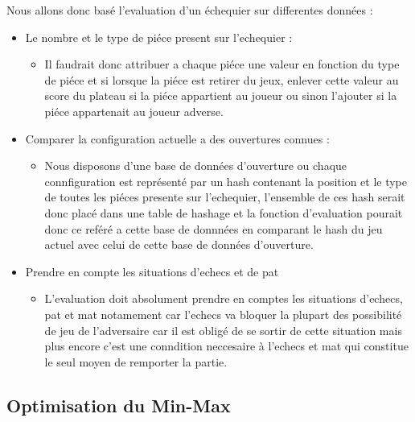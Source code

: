 \documentclass[12pt]{article}
\begin{document}
Nous allons donc basé l'evaluation d'un échequier sur differentes
données :

\begin{itemize}
\item
  Le nombre et le type de piéce present sur l'echequier :

  \begin{itemize}
  \itemsep1pt\parskip0pt
  \item
    Il faudrait donc attribuer a chaque piéce une valeur en fonction du
    type de piéce et si lorsque la piéce est retirer du jeux, enlever
    cette valeur au score du plateau si la piéce appartient au joueur ou
    sinon l'ajouter si la piéce appartenait au joueur adverse.
  \end{itemize}
\item
  Comparer la configuration actuelle a des ouvertures connues :

  \begin{itemize}
  \itemsep1pt\parskip0pt
  \item
    Nous disposons d'une base de données d'ouverture ou chaque
    connfiguration est représenté par un hash contenant la position et
    le type de toutes les piéces presente sur l'echequier, l'ensemble de
    ces hash serait donc placé dans une table de hashage et la fonction
    d'evaluation pourait donc ce reféré a cette base de donnnées en
    comparant le hash du jeu actuel avec celui de cette base de données
    d'ouverture.
  \end{itemize}
\item
  Prendre en compte les situations d'echecs et de pat

  \begin{itemize}
  \itemsep1pt\parskip0pt
  \item
    L'evaluation doit absolument prendre en comptes les situations
    d'echecs, pat et mat notamement car l'echecs va bloquer la plupart
    des possibilité de jeu de l'adversaire car il est obligé de se
    sortir de cette situation mais plus encore c'est une conndition
    neccesaire à l'echecs et mat qui constitue le seul moyen de
    remporter la partie.
  \end{itemize}
\end{itemize}

\subsection{Optimisation du Min-Max}\label{optimisation-du-min-max}
\end{document}
